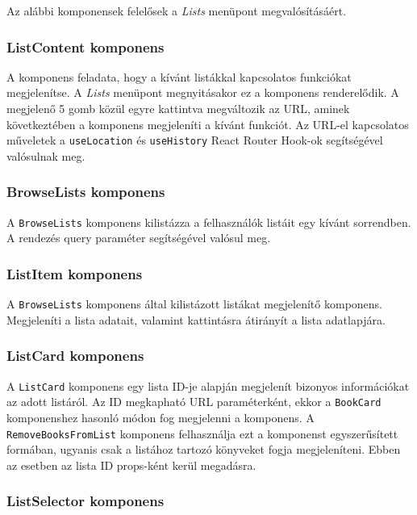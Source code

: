 Az alábbi komponensek felelősek a \textit{Lists} menüpont megvalósításáért.

\subsubsection{ListContent komponens}

A komponens feladata, hogy a kívánt listákkal kapcsolatos funkciókat megjelenítse. A \textit{Lists} menüpont megnyitásakor ez a komponens renderelődik. A megjelenő 5 gomb közül egyre kattintva megváltozik az URL, aminek következtében a komponens megjeleníti a kívánt funkciót. Az URL-el kapcsolatos műveletek a \texttt{useLocation} és \texttt{useHistory} React Router Hook-ok segítségével valósulnak meg.

\subsubsection{BrowseLists komponens}

A \texttt{BrowseLists} komponens kilistázza a felhasználók listáit egy kívánt sorrendben. A rendezés query paraméter segítségével valósul meg.

\subsubsection{ListItem komponens}

A \texttt{BrowseLists} komponens által kilistázott listákat megjelenítő komponens. Megjeleníti a lista adatait, valamint kattintásra átirányít a lista adatlapjára.

\subsubsection{ListCard komponens}

A \texttt{ListCard} komponens egy lista ID-je alapján megjelenít bizonyos információkat az adott listáról. Az ID  megkapható URL paraméterként, ekkor a \texttt{BookCard} komponenshez hasonló módon fog megjelenni a komponens. A \texttt{RemoveBooksFromList} komponens felhasználja ezt a komponenst egyszerűsített formában, ugyanis csak a listához tartozó könyveket fogja megjeleníteni. Ebben az esetben az lista ID props-ként kerül megadásra.

\subsubsection{ListSelector komponens}

